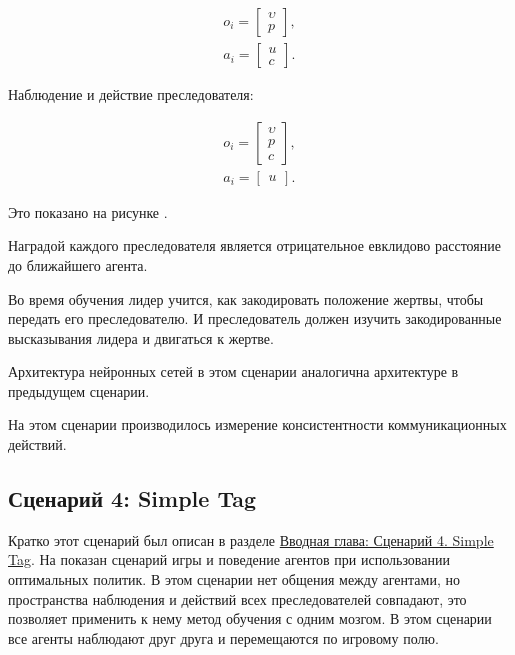 \begin{equation}
    \begin{multlined}
        o_i = \begin{bmatrix}
                  \upsilon \\ p
        \end{bmatrix}, \\
        a_i = \begin{bmatrix}
                  u \\ c
        \end{bmatrix}.
    \end{multlined}
\end{equation}

Наблюдение и действие преследователя:

\begin{equation}
    \begin{multlined}
        o_i = \begin{bmatrix}
                  \upsilon \\ p \\ c
        \end{bmatrix}, \\
        a_i = \begin{bmatrix}
                  u
        \end{bmatrix}.
    \end{multlined}
\end{equation}

Это показано на рисунке .

Наградой каждого преследователя является отрицательное евклидово расстояние до ближайшего агента.

Во время обучения лидер учится, как закодировать положение жертвы, чтобы передать его преследователю. И преследователь должен изучить закодированные высказывания лидера и двигаться к жертве.

Архитектура нейронных сетей в этом сценарии аналогична архитектуре в предыдущем сценарии.

На этом сценарии производилось измерение консистентности коммуникационных действий.

\subsection{Сценарий 4: Simple Tag} \label{exp-st}

Кратко этот сценарий был описан в разделе \hyperref[intro-st]{Вводная глава: Сценарий 4. Simple Tag}. На  показан сценарий игры и поведение агентов при использовании оптимальных политик. В этом сценарии нет общения между агентами, но пространства наблюдения и действий всех преследователей совпадают, это позволяет применить к нему метод обучения с одним мозгом. В этом сценарии все агенты наблюдают друг друга и перемещаются по игровому полю.

